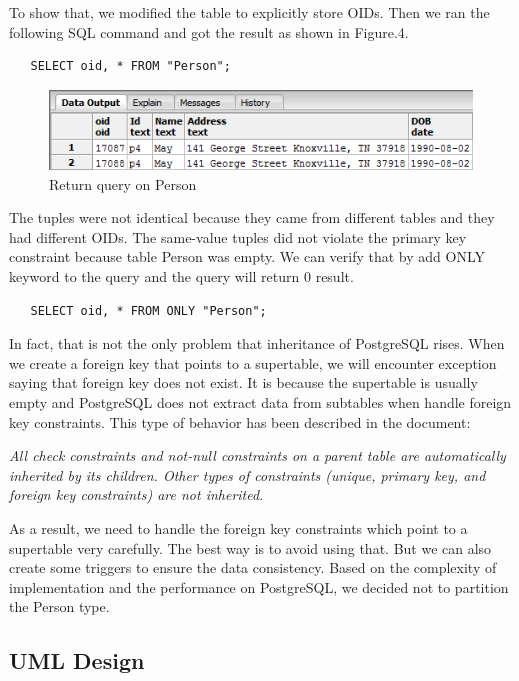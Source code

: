 \documentclass[11pt]{article}
\begin{document}
\par
To show that, we modified the table to explicitly store OIDs. Then we ran the following SQL command and got the result as shown in Figure.4.
\begin{verbatim}
   SELECT oid, * FROM "Person";
\end{verbatim}

\begin{figure}[!htp]
\centering
\includegraphics{F4.png}
\caption{Return query on Person}
\end{figure}

\par
The tuples were not identical because they came from different tables and they had different OIDs. The same-value tuples did not violate the primary key constraint because table Person was empty. We can verify that by add ONLY keyword to the query and the query will return 0 result.
\begin{verbatim}
   SELECT oid, * FROM ONLY "Person";
\end{verbatim}

\par
In fact, that is not the only problem that inheritance of PostgreSQL rises. When we create a foreign key that points to a supertable, we will encounter exception saying that foreign key does not exist. It is because the supertable is usually empty and PostgreSQL does not extract data from subtables when handle foreign key constraints. This type of behavior has been described in the document:
\par
\emph{All check constraints and not-null constraints on a parent table are automatically inherited by its children. Other types of constraints (unique, primary key, and foreign key constraints) are not inherited.}
\par
As a result, we need to handle the foreign key constraints which point to a supertable very carefully. The best way is to avoid using that. But we can also create some triggers to ensure the data consistency. Based on the complexity of implementation and the performance on PostgreSQL, we decided not to partition the Person type.

\subsection{UML Design}
\end{document}
